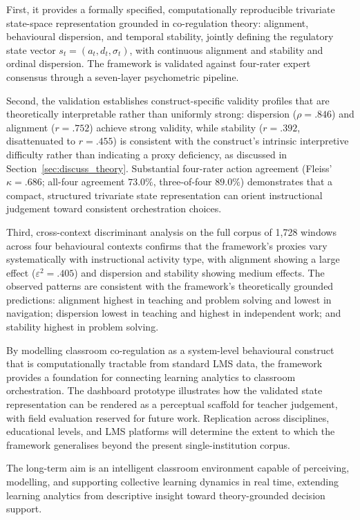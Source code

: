 \documentclass[preprint,12pt,authoryear]{elsarticle}
\begin{document}
First, it provides a formally specified, computationally reproducible trivariate state-space representation grounded in co-regulation theory: alignment, behavioural dispersion, and temporal stability, jointly defining the regulatory state vector $s_t = (a_t, d_t, \sigma_t)$, with continuous alignment and stability and ordinal dispersion. The framework is validated against four-rater expert consensus through a seven-layer psychometric pipeline.

Second, the validation establishes construct-specific validity profiles that are theoretically interpretable rather than uniformly strong: dispersion ($\rho = .846$) and alignment ($r = .752$) achieve strong validity, while stability ($r = .392$, disattenuated to $r = .455$) is consistent with the construct's intrinsic interpretive difficulty rather than indicating a proxy deficiency, as discussed in Section~\ref{sec:discuss_theory}. Substantial four-rater action agreement (Fleiss' $\kappa = .686$; all-four agreement $73.0\%$, three-of-four $89.0\%$) demonstrates that a compact, structured trivariate state representation can orient instructional judgement toward consistent orchestration choices.

Third, cross-context discriminant analysis on the full corpus of 1{,}728 windows across four behavioural contexts confirms that the framework's proxies vary systematically with instructional activity type, with alignment showing a large effect ($\varepsilon^2 = .405$) and dispersion and stability showing medium effects. The observed patterns are consistent with the framework's theoretically grounded predictions: alignment highest in teaching and problem solving and lowest in navigation; dispersion lowest in teaching and highest in independent work; and stability highest in problem solving.

By modelling classroom co-regulation as a system-level behavioural construct that is computationally tractable from standard LMS data, the framework provides a foundation for connecting learning analytics to classroom orchestration. The dashboard prototype illustrates how the validated state representation can be rendered as a perceptual scaffold for teacher judgement, with field evaluation reserved for future work. Replication across disciplines, educational levels, and LMS platforms will determine the extent to which the framework generalises beyond the present single-institution corpus.

The long-term aim is an intelligent classroom environment capable of perceiving, modelling, and supporting collective learning dynamics in real time, extending learning analytics from descriptive insight toward theory-grounded decision support.






\end{document}
